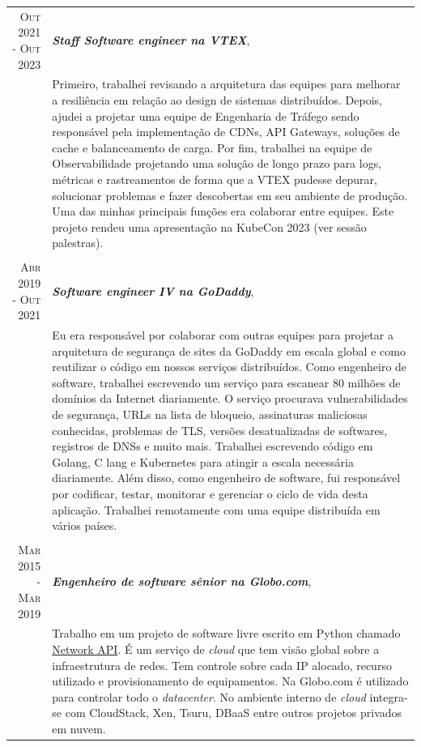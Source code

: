 \documentclass[a4paper,10pt]{article} %
\begin{document}
\begin{longtable}{r|p{11cm}}
\textsc{Out 2021 - Out 2023} & \emph{\bf Staff Software engineer na VTEX}, \\
& \footnotesize{
    Primeiro, trabalhei revisando a arquitetura das equipes para melhorar
    a resiliência em relação ao design de sistemas distribuídos. Depois, ajudei
    a projetar uma equipe de Engenharia de Tráfego sendo responsável pela implementação de CDNs,
    API Gateways, soluções de cache e balanceamento de carga. Por fim, trabalhei na
    equipe de Observabilidade projetando uma solução de longo prazo para logs, métricas e
    rastreamentos de forma que a VTEX pudesse depurar, solucionar problemas e fazer descobertas
    em seu ambiente de produção. Uma das minhas principais funções era colaborar entre equipes.
    Este projeto rendeu uma apresentação na KubeCon 2023 (ver sessão palestras).
  } \\
\multicolumn{2}{c}{} \\

\textsc{Abr 2019 - Out 2021} & \emph{\bf Software engineer IV na GoDaddy}, \\
& \footnotesize{
    Eu era responsável por colaborar com outras equipes para projetar
    a arquitetura de segurança de sites da GoDaddy em escala global e como 
    reutilizar o código em nossos serviços distribuídos.
    Como engenheiro de software, trabalhei escrevendo um serviço para escanear
    80 milhões de domínios da Internet diariamente. O serviço procurava vulnerabilidades de
    segurança, URLs na lista de bloqueio, assinaturas maliciosas conhecidas,
    problemas de TLS, versões desatualizadas de softwares, registros de DNSs e muito mais.
    Trabalhei escrevendo código em Golang, C lang e Kubernetes para atingir a
    escala necessária diariamente. Além disso, como engenheiro de software, fui responsável 
    por codificar, testar, monitorar e gerenciar o ciclo de vida desta aplicação.
    Trabalhei remotamente com uma equipe distribuída em vários países. } \\
\multicolumn{2}{c}{} \\

\textsc{Mar 2015 - Mar 2019} & \emph{\bf Engenheiro de software sênior na Globo.com}, \\
& \footnotesize{Trabalho em um projeto de software livre escrito em Python
    chamado \href{https://github.com/globocom/GloboNetworkAPI}{Network API}.
    É um serviço de \emph{cloud} que tem visão global sobre a infraestrutura
    de redes. Tem controle sobre cada IP alocado, recurso utilizado e
    provisionamento de equipamentos. Na Globo.com é utilizado para controlar
    todo o \emph{datacenter}. No ambiente interno de \emph{cloud} integra-se
    com CloudStack, Xen, Tsuru, DBaaS entre outros projetos privados em nuvem.

}
\end{longtable}
\end{document}
